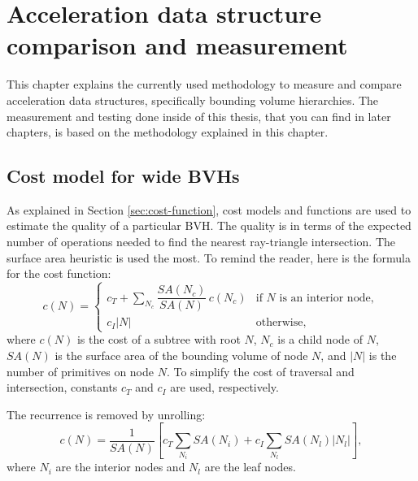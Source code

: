 \chapter{Acceleration data structure comparison and measurement}
\label{chap:measurement}

\begin{chapterabstract}
This chapter explains the currently used methodology to measure and compare acceleration data structures, specifically bounding volume hierarchies. The measurement and testing done inside of this thesis, that you can find in later chapters, is based on the methodology explained in this chapter. 
\end{chapterabstract}

\section{Cost model for wide BVHs}

As explained in Section \ref{sec:cost-function}, cost models and functions are used to estimate the quality of a particular BVH. The quality is in terms of the expected number of operations needed to find the nearest ray-triangle intersection. The surface area heuristic \cite{GS87} is used the most. To remind the reader, here is the formula for the cost function:
\begin{equation}
    c(N) =
    \begin{cases}
        c_T + \displaystyle\sum_{N_c} \dfrac{SA(N_c)}{SA(N)}\,c(N_c) & \text{if } N \text{ is an interior node}, \\[6pt]
        c_I \lvert N \rvert & \text{otherwise},
    \end{cases}
    \label{eq:SAH-cost-model}
\end{equation}
where $c(N)$ is the cost of a subtree with root $N$, $N_c$ is a child node of $N$, $SA(N)$ is the surface area of the bounding volume of node $N$, and $|N|$ is the number of primitives on node $N$. To simplify the cost of traversal and intersection, constants $c_T$ and $c_I$ are used, respectively.

The recurrence is removed by unrolling:
\begin{equation}
    c(N) = \frac{1}{SA(N)} \left[ c_T \sum_{N_i} SA(N_i) + c_I \sum_{N_l} SA(N_l) \lvert N_l \rvert \right], 
    \label{eq:SAH-cost-model-unrolled}
\end{equation}
where $N_i$ are the interior nodes and $N_l$ are the leaf nodes.

